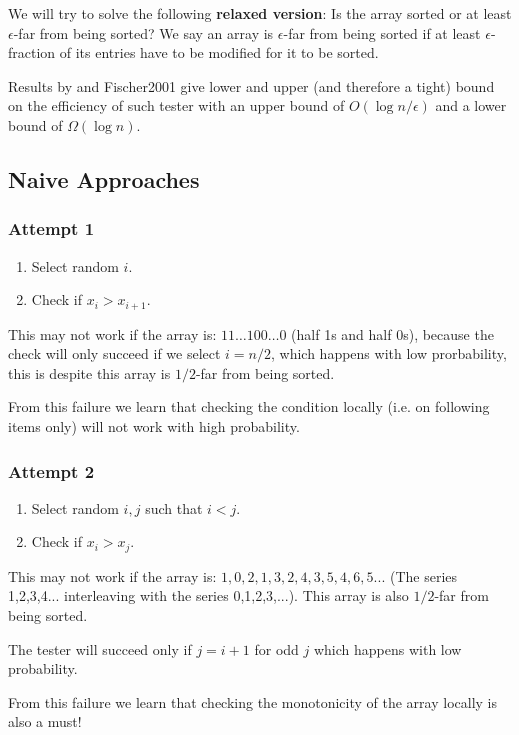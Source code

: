 We will try to solve the following \textbf{relaxed version}: Is the array sorted or at least $\epsilon$-far from being sorted?
We say an array is $\epsilon$-far from being sorted if at least $\epsilon$-fraction of its entries have to be modified for it to be sorted.

Results by \cite{ergun2000spot} and Fischer2001 give lower and upper (and therefore a tight) bound on the efficiency of such tester with an upper bound of $O(\log n / \epsilon)$ and a lower bound of $\Omega(\log n)$.

\subsection{Naive Approaches}
\subsubsection{Attempt 1}
\begin{enumerate}
    \item Select random $i$.
    \item Check if $x_i > x_{i+1}$.
\end{enumerate}

This may not work if the array is: $11\ldots 100\ldots 0$ (half 1s and half 0s), because the check will only succeed if we select $i=n/2$, which happens with low prorbability, this is despite this array is $1/2$-far from being sorted.

From this failure we learn that checking the condition locally (i.e. on following items only) will not work with high probability.

\subsubsection{Attempt 2}
\begin{enumerate}
    \item Select random $i,j$ such that $i<j$.
    \item Check if $x_i > x_j$.
\end{enumerate}

This may not work if the array is: $1,0,2,1,3,2,4,3,5,4,6,5...$ (The series 1,2,3,4... interleaving with the series 0,1,2,3,...).
This array is also $1/2$-far from being sorted.

The tester will succeed only if $j=i+1$ for odd $j$ which happens with low probability.

From this failure we learn that checking the monotonicity of the array locally is also a must!

